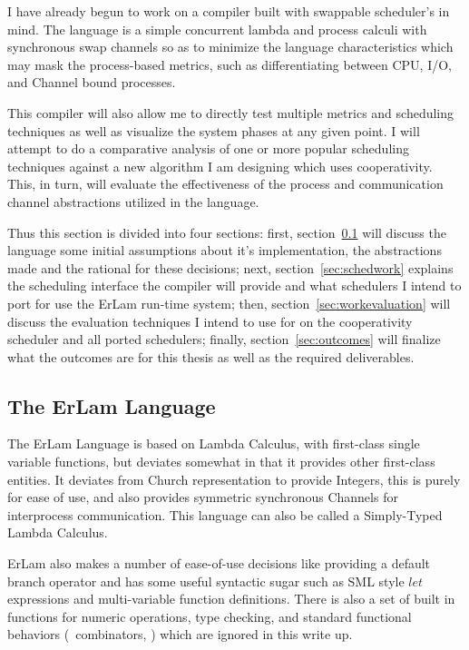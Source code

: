 I have already begun to work on a compiler built with swappable scheduler's in mind. The language
is a simple concurrent lambda and process calculi with synchronous swap channels so as to minimize 
the language characteristics which may mask the process-based metrics, such as differentiating between CPU, I/O,
and Channel bound processes. 

This compiler will also allow me to directly test multiple metrics and scheduling techniques as well as visualize the 
system phases at any given point. I will attempt to do a comparative analysis of one or more popular scheduling 
techniques against a new algorithm I am designing which uses cooperativity. This, in turn, will evaluate 
the effectiveness of the process and communication channel abstractions utilized in the language.

Thus this section is divided into four sections: first, section~\ref{sec:erlamlang} will discuss the language some
initial assumptions about it's implementation, the abstractions made and the rational for these decisions; next, 
section~\ref{sec:schedwork} explains the scheduling interface the compiler will provide and what schedulers I intend 
to port for use the ErLam run-time system; then, section~\ref{sec:workevaluation} will discuss the evaluation 
techniques I intend to use for on the cooperativity scheduler and all ported schedulers; finally, 
section~\ref{sec:outcomes} will finalize what the outcomes are for this thesis as well as the required deliverables.

\subsection{The ErLam Language}
\label{sec:erlamlang}

The ErLam Language is based on Lambda Calculus, with first-class single variable functions, but deviates somewhat
in that it provides other first-class entities. It deviates from Church representation to provide Integers, this is
purely for ease of use, and also provides symmetric synchronous Channels for interprocess communication. This 
language can also be called a Simply-Typed Lambda Calculus.

ErLam also makes a number of ease-of-use decisions like providing a default branch operator and has some useful
syntactic sugar such as SML style $let$ expressions and multi-variable function definitions. There is also a set of
built in functions for numeric operations, type checking, and standard functional behaviors (\eg~combinators, \etc)
which are ignored in this write up.

